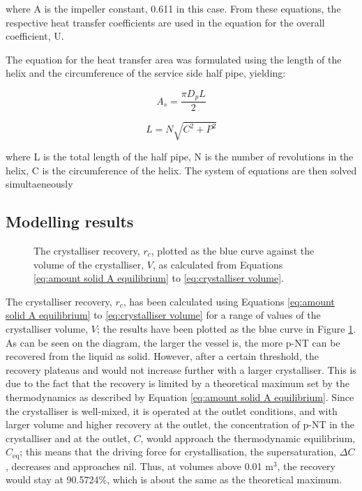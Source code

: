 where A is the impeller constant, 0.611 in this case. From these equations, the respective heat transfer coefficients are used in the equation for the overall coefficient, U.



The equation for the heat transfer area was formulated using the length of the helix and the circumference of the service side half pipe, yielding:

\begin{equation} \label{eq:coolantpipesa}
    A_s = \frac{\pi D_p L}{2}
    \end{equation}
    
\begin{equation}\label{eq:helixlength}
    L = N \sqrt{C^2 + P^2}
\end{equation}

where L is the total length of the half pipe, N is the number of revolutions in the helix, C is the circumference of the helix. The system of equations are then solved simultaeneously 




\subsection{Modelling results}\label{sec:modelling results crystalliser}

\begin{figure}[h]
    \centering
    
    \caption{The crystalliser recovery, $r_c$, plotted as the blue curve against the volume of the crystalliser, $V$, as calculated from Equations \ref{eq:amount solid A equilibrium} to \ref{eq:crystalliser volume}. }
    \label{fig:recovery vs volume crystalliser}
\end{figure}

\noindent The crystalliser recovery, $r_c$, has been calculated using Equations \ref{eq:amount solid A equilibrium} to \ref{eq:crystalliser volume} for a range of values of the crystalliser volume, $V$; the results have been plotted as the blue curve in Figure \ref{fig:recovery vs volume crystalliser}. As can be seen on the diagram, the larger the vessel is, the more p-NT can be recovered from the liquid as solid. However, after a certain threshold, the recovery plateaus and would not increase further with a larger crystalliser. This is due to the fact that the recovery is limited by a theoretical maximum set by the thermodynamics as described by Equation \ref{eq:amount solid A equilibrium}. Since the crystalliser is well-mixed, it is operated at the outlet conditions, and with larger volume and higher recovery at the outlet, the concentration of p-NT in the crystalliser and at the outlet, $C$, would approach the thermodynamic equilibrium, $C_{\mathrm{eq}}$; this means that the driving force for crystallisation, the supersaturation, $\Delta C$, decreases and approaches nil. Thus, at volumes above 0.01 m$^{3}$, the recovery would stay at 90.5724\%, which is about the same as the theoretical maximum. 


